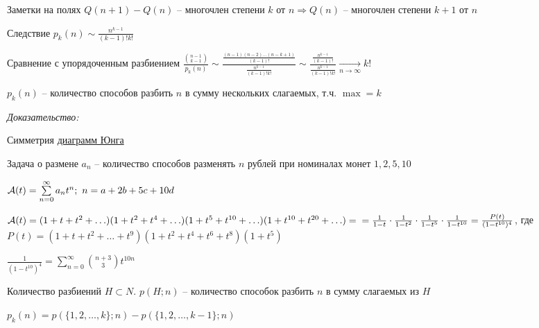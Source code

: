 \documentclass[12pt]{article}
\begin{document}
\begin{Exercise}{Заметки на полях}
    $Q(n + 1) - Q(n)$ -- многочлен степени $k$ от $n \Rightarrow Q(n)$ -- многочлен степени $k + 1$ от $n$
\end{Exercise}

\begin{theo}{Следствие}
    $p_k(n) \sim \frac{n^{k - 1}}{(k - 1)!k!}$
\end{theo}

\begin{Remark}{Сравнение с упорядоченным разбиением}
    $\frac{{n - 1 \choose k - 1}}{p_k(n)} \sim \frac{\frac{(n - 1)(n - 2)\ldots(n - k + 1)}{(k - 1)!}}{\frac{n^{k - 1}}{(k - 1)!k!}} \sim \frac{\frac{n^{k - 1}}{(k - 1)!}}{\frac{n^{k - 1}}{(k - 1)!k!}} \xrightarrow[n \to \infty]{} k!$
\end{Remark}

\begin{theo}{}
    $p_k(n)$ -- количество способов разбить $n$ в сумму нескольких слагаемых, т.ч. $\max = k$
\end{theo}

\textit{Доказательство:}

Симметрия \href{https://ru.wikipedia.org/wiki/%D0%94%D0%B8%D0%B0%D0%B3%D1%80%D0%B0%D0%BC%D0%BC%D0%B0_%D0%AE%D0%BD%D0%B3%D0%B0}{диаграмм Юнга}

\begin{nota}{Задача о размене}
    $a_n$ -- количество способов разменять $n$ рублей при номиналах монет $1, 2, 5, 10$

    $\mathcal{A}(t) = \sum\limits_{n = 0}^\infty a_nt^n;\ n = a + 2b + 5c + 10d$

    $\mathcal{A}(t) = (1 + t + t^2 + \ldots)(1 + t^2 + t^4 + \ldots)(1 + t^5 + t^{10} + \ldots)(1 + t^{10} + t^{20} + \ldots) = \\
    = \frac{1}{1 - t} \cdot \frac{1}{1 - t^2} \cdot \frac{1}{1 - t^5} \cdot \frac{1}{1 - t^{10}} = \frac{P(t)}{(1 - t^{10})^4}$, где $P(t) = ( 1 + t + t^2 + \ldots + t^9)(1 + t^2 + t^4 + t^6 + t^8)(1 + t^5)$ 

    $\frac{1}{(1 - t^{10})^4} = \sum\limits_{n = 0}^\infty {n + 3 \choose 3}t^{10n}$
\end{nota}

\begin{defin}{Количество разбиений}
    $H \subset N$. $p(H; n)$ -- количество способок разбить $n$ в сумму слагаемых из $H$

    $p_k(n) = p(\{1, 2, \ldots, k\}; n) - p(\{1, 2, \ldots, k - 1\}; n)$
\end{defin}
\end{document}

